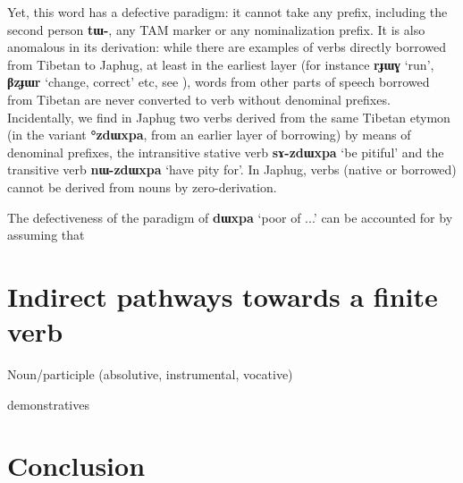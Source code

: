 \documentclass[11pt]{article}
\newcommand{\ipa}[1]{{\phon\textbf{#1}}}
\begin{document}
Yet, this word has a defective paradigm: it cannot take any prefix, including the second person \ipa{tɯ-}, any TAM marker or any nominalization prefix. It is also anomalous in its derivation: while there are examples of verbs directly borrowed from Tibetan to Japhug, at least in the earliest layer (for instance \ipa{rɟɯɣ} `run', \ipa{βzɟɯr} `change, correct' etc, see \citealt{jacques18contact}), words from other parts of speech borrowed from Tibetan are never converted to verb without denominal prefixes. Incidentally, we find in Japhug two verbs derived from the same Tibetan etymon (in the variant \ipa{°zdɯxpa}, from an earlier layer of borrowing) by means of denominal prefixes, the intransitive stative verb \ipa{sɤ-zdɯxpa} `be pitiful' and the transitive verb \ipa{nɯ-zdɯxpa} `have pity for'. In Japhug, verbs (native or borrowed) cannot be derived from nouns by zero-derivation.

The defectiveness of the paradigm of \ipa{dɯxpa} `poor of ...' can be accounted for by assuming that 

\section{Indirect pathways towards a finite verb}

Noun/participle (absolutive, instrumental, vocative)

demonstratives

\section*{Conclusion}




 
\end{document}
